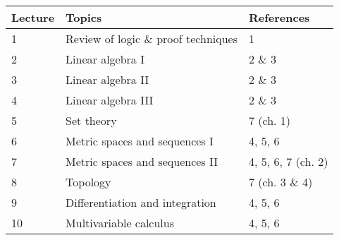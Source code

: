 \documentclass[12pt]{article}
\begin{document}
\begin{longtable}{| p{1.5cm}  | p{8cm} | p{3cm} |}
\hline
{\bf{Lecture}}  & {\bf{Topics}} &  {\bf{References}} \\
\hline
1  & Review of logic \& proof techniques &  1 \\
\hline
2 &  Linear algebra I & 2 \& 3 \\
\hline
3  &  Linear algebra II & 2 \& 3  \\
\hline
4  & Linear algebra III &  2 \& 3 \\
\hline
5  & Set theory & 7 (ch. 1) \\
\hline
6  &  Metric spaces and sequences I &  4, 5, 6\\
\hline
7  & Metric spaces and sequences II & 4, 5, 6, 7 (ch. 2)  \\
\hline
8  & Topology & 7 (ch. 3 \& 4) \\
 \hline
9  &  Differentiation and integration &  4, 5, 6 \\
\hline
10  &   Multivariable calculus & 4, 5, 6 \\
\hline
\end{longtable}
\end{document}
